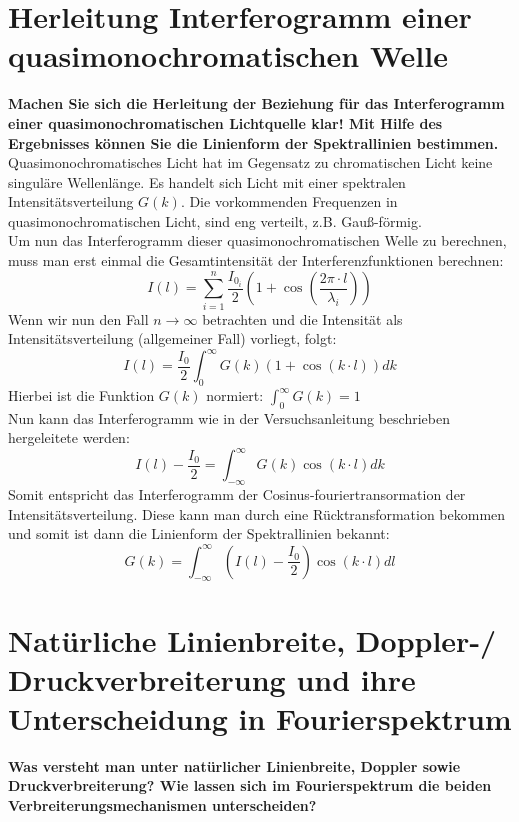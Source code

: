 \section{Herleitung Interferogramm einer quasimonochromatischen Welle}
\textbf{Machen Sie sich die Herleitung der Beziehung für das Interferogramm einer quasimonochromatischen Lichtquelle klar! Mit Hilfe des Ergebnisses können Sie die Linienform der Spektrallinien bestimmen.}\\

Quasimonochromatisches Licht hat im Gegensatz zu chromatischen Licht keine singuläre Wellenlänge.
Es handelt sich Licht mit einer spektralen Intensitätsverteilung $G(k)$.
Die vorkommenden Frequenzen in quasimonochromatischen Licht, sind eng verteilt, z.B. Gauß-förmig.\\%

Um nun das Interferogramm dieser quasimonochromatischen Welle zu berechnen, muss man erst einmal die Gesamtintensität der Interferenzfunktionen berechnen:
\begin{equation}
    I(l)=\sum_{i=1}^n\frac{I_{0_i}}{2}\left(1+\cos(\frac{2\pi\cdot l}{\lambda_i})\right)
\end{equation}
Wenn wir nun den Fall $n\to\infty$ betrachten und die Intensität als Intensitätsverteilung (allgemeiner Fall) vorliegt, folgt:
\begin{equation}
    I(l)=\frac{I_0}{2}\int_0^\infty G(k)\left(1+\cos(k\cdot l)\right)dk
\end{equation}
Hierbei ist die Funktion $G(k)$ normiert: $\int_0^\infty G(k)=1$\\
Nun kann das Interferogramm wie in der Versuchsanleitung beschrieben hergeleitete werden:
\begin{equation}
    I(l)-\frac{I_0}{2}=\int_{-\infty}^\infty G(k)\cos(k\cdot l)dk
\end{equation}
Somit entspricht das Interferogramm der Cosinus-fouriertransormation der Intensitätsverteilung.
Diese kann man durch eine Rücktransformation bekommen und somit ist dann die Linienform der Spektrallinien bekannt:
\begin{equation}
    G(k)=\int_{-\infty}^\infty\left(I(l)-\frac{I_0}{2}\right)\cos(k\cdot l)dl
\end{equation}\newpage
\section{Natürliche Linienbreite, Doppler-/ Druckverbreiterung und ihre Unterscheidung in Fourierspektrum}
\textbf{Was versteht man unter natürlicher Linienbreite, Doppler sowie Druckverbreiterung? Wie lassen sich im Fourierspektrum die beiden Verbreiterungsmechanismen unterscheiden?}\\
